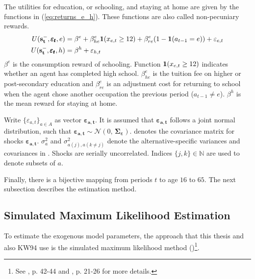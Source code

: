 The utilities for education, or schooling, and staying at home are given by the functions in (\ref{eq:returns_e_h}). These functions are also called non-pecuniary rewards.
\begin{equation} \label{eq:returns_e_h}
\begin{aligned}
U(\bold{s_t^-}, \pmb{\varepsilon_t},e) &= \beta^e + \beta_{he}^e \bold 1(x_{e,t} \geq 12) + \beta_{re}^e(1-\bold1(a_{t-1}=e)) + \varepsilon_{e,t} \\
U(\bold{s_t^-},\pmb{\varepsilon_t},h) &= \beta^h + \varepsilon_{h,t} \\
\end{aligned}
\end{equation}
\noindent
$\beta^e$ is the consumption reward of schooling. Function $\bold 1(x_{e,t} \geq 12)$ indicates whether an agent has completed high school. $\beta_{he}^e$ is the tuition fee on higher or post-secondary education and $\beta_{re}^e$ is an adjustment cost for returning to school when the agent chose another occupation the previous period ($a_{t-1}\neq e$). $\beta^h$ is the mean reward for staying at home.

Write $\{\varepsilon_{a,t}\}_{a \in A}$ as vector $\pmb{\varepsilon_{a,t}}$. It is assumed that $\pmb{\varepsilon_{a,t}}$ follows a joint normal distribution, such that $\pmb{\varepsilon_{a,t}} \sim \mathcal{N}(0,\,\pmb{\Sigma_\varepsilon})$. \pmb{$\Sigma_\varepsilon$} denotes the covariance matrix for shocks $\pmb{\varepsilon_{a,t}}$. $\sigma_a^{2}$ and $\sigma^{2}_{a(j),a(k\neq j)}$ denote the alternative-specific variances and covariances in \pmb{$\Sigma_\varepsilon$}. Shocks are serially uncorrelated. Indices $\{j,k\} \in \mathbb{N}$ are used to denote subsets of $a$.

Finally, there is a bijective mapping from periods $t$ to age $16$ to $65$. The next subsection describes the estimation method.

\subsection{Simulated Maximum Likelihood Estimation}

To estimate the exogenous model parameters, the approach that this thesis and also KW94 use is the simulated maximum likelihood method (\cite{Albright.1977})\footnote{See \cite{Aguirregabiria.2010}, p. 42-44 and \cite{Raabe.2019}, p. 21-26 for more details.}.

